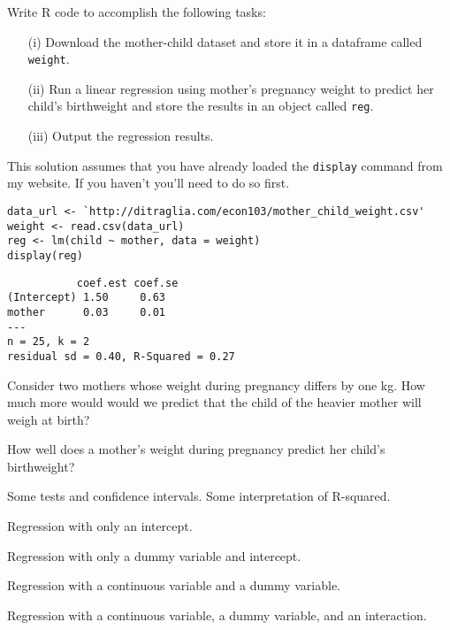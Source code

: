 \documentclass[addpoints,12pt]{exam}
\begin{document}
\begin{questions}
\question Write R code to accomplish the following tasks: 
\begin{enumerate} 
  \item[(i)] Download the mother-child dataset and store it in a dataframe called \texttt{weight}.
  \item[(ii)] Run a linear regression using mother's pregnancy weight to predict her child's birthweight and store the results in an object called \texttt{reg}.
  \item[(iii)] Output the regression results. 
\end{enumerate}
\begin{solution}
  This solution assumes that you have already loaded the \texttt{display} command from my website. If you haven't you'll need to do so first.
\begin{verbatim}
data_url <- `http://ditraglia.com/econ103/mother_child_weight.csv'
weight <- read.csv(data_url)
reg <- lm(child ~ mother, data = weight)
display(reg)
\end{verbatim}
\end{solution}

\begin{verbatim}
           coef.est coef.se
(Intercept) 1.50     0.63   
mother      0.03     0.01   
---
n = 25, k = 2
residual sd = 0.40, R-Squared = 0.27
\end{verbatim}

\question Consider two mothers whose weight during pregnancy differs by one kg.
How much more would would we predict that the child of the heavier mother will weigh at birth? 

\question How well does a mother's weight during pregnancy predict her child's birthweight? 

\question Some tests and confidence intervals. Some interpretation of R-squared.


 
\question Regression with only an intercept.

\question Regression with only a dummy variable and intercept.

\question Regression with a continuous variable and a dummy variable.

\question Regression with a continuous variable, a dummy variable, and an interaction.

\end{questions}
\end{document}
